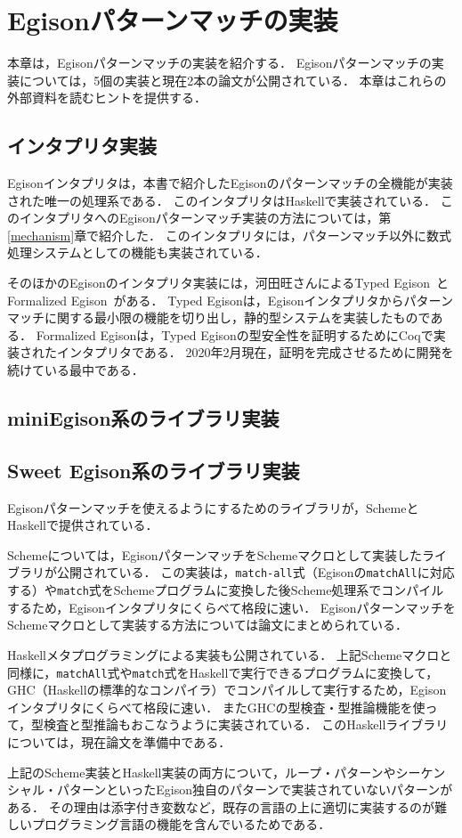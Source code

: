 \chapter{Egisonパターンマッチの実装}\label{implementation}

本章は，Egisonパターンマッチの実装を紹介する．
Egisonパターンマッチの実装については，5個の実装と現在2本の論文が公開されている．
本章はこれらの外部資料を読むヒントを提供する．

\section{インタプリタ実装}

Egisonインタプリタ\cite{egisonGitHub}は，本書で紹介したEgisonのパターンマッチの全機能が実装された唯一の処理系である．
このインタプリタはHaskellで実装されている．
このインタプリタへのEgisonパターンマッチ実装の方法については，第\ref{mechanism}章で紹介した．
このインタプリタには，パターンマッチ以外に数式処理システムとしての機能も実装されている．

そのほかのEgisonのインタプリタ実装には，河田旺さんによるTyped Egison~\cite{typedEgison}とFormalized Egison~\cite{formalizedEgison}がある．
Typed Egisonは，Egisonインタプリタからパターンマッチに関する最小限の機能を切り出し，静的型システムを実装したものである．
Formalized Egisonは，Typed Egisonの型安全性を証明するためにCoqで実装されたインタプリタである．
2020年2月現在，証明を完成させるために開発を続けている最中である．

\section{miniEgison系のライブラリ実装}


\section{Sweet Egison系のライブラリ実装}

Egisonパターンマッチを使えるようにするためのライブラリが，SchemeとHaskellで提供されている．

Schemeについては，EgisonパターンマッチをSchemeマクロとして実装\cite{egisonScheme}したライブラリが公開されている．
この実装は，\lstinline{match-all}式（Egisonの\lstinline{matchAll}に対応する）や\lstinline{match}式をSchemeプログラムに変換した後Scheme処理系でコンパイルするため，Egisonインタプリタにくらべて格段に速い．
EgisonパターンマッチをSchemeマクロとして実装する方法については論文\cite{egi2019macro}にまとめられている．

Haskellメタプログラミングによる実装\cite{egisonHaskell}も公開されている．
上記Schemeマクロと同様に，\lstinline{matchAll}式や\lstinline{match}式をHaskellで実行できるプログラムに変換して，GHC（Haskellの標準的なコンパイラ）でコンパイルして実行するため，Egisonインタプリタにくらべて格段に速い．
またGHCの型検査・型推論機能を使って，型検査と型推論もおこなうように実装されている．
このHaskellライブラリについては，現在論文を準備中である．

上記のScheme実装とHaskell実装の両方について，ループ・パターンやシーケンシャル・パターンといったEgison独自のパターンで実装されていないパターンがある．
その理由は添字付き変数など，既存の言語の上に適切に実装するのが難しいプログラミング言語の機能を含んでいるためである．
